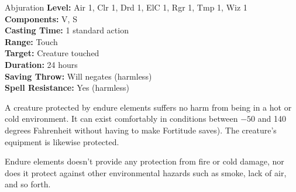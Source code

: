 {Abjuration}
{
	\textbf{Level:}
	Air 1, Clr 1, Drd 1, ElC 1, Rgr 1, Tmp 1, Wiz 1\\
	\textbf{Components:}
	V, S\\
	\textbf{Casting Time:}
	1 standard action\\
	\textbf{Range:}
	Touch\\
	\textbf{Target:}
	Creature touched\\
	\textbf{Duration:}
	24 hours\\
	\textbf{Saving Throw:}
	Will negates (harmless)\\
	\textbf{Spell Resistance:}
	Yes (harmless)\\
}
{
	A creature protected by endure elements suffers no harm from being in a hot or cold environment. It can exist comfortably in conditions between $-50$ and 140 degrees Fahrenheit without having to make Fortitude saves). The creature's equipment is likewise protected.

	Endure elements doesn't provide any protection from fire or cold damage, nor does it protect against other environmental hazards such as smoke, lack of air, and so forth.

}
